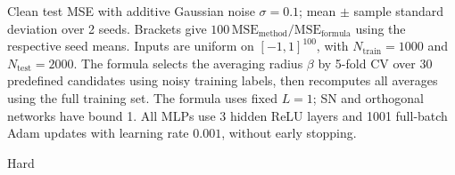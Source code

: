 \documentclass[10pt]{article}
\begin{document}
\begin{table}[t]
\centering
\footnotesize
\setlength{\tabcolsep}{3pt}
\caption{Clean test MSE with additive Gaussian noise $\sigma=0.1$; mean $\pm$ sample standard deviation over 2 seeds. Brackets give $100\,\mathrm{MSE}_{\mathrm{method}}/\mathrm{MSE}_{\mathrm{formula}}$ using the respective seed means. Inputs are uniform on $[-1,1]^{100}$, with $N_{\mathrm{train}}=1000$ and $N_{\mathrm{test}}=2000$. The formula selects the averaging radius $\beta$ by 5-fold CV over 30 predefined candidates using noisy training labels, then recomputes all averages using the full training set. The formula uses fixed $L=1$; SN and orthogonal networks have bound 1. All MLPs use 3 hidden ReLU layers and 1001 full-batch Adam updates with learning rate $0.001$, without early stopping.}
\label{tab:noisy-0p1-ratio1}
\begin{subtable}{\textwidth}
\centering
\caption{Hard}
\label{tab:noisy-0p1-ratio1-1}
\end{subtable}
\par\medskip
\begin{subtable}{\textwidth}
\centering
\caption{Tied}
\label{tab:noisy-0p1-ratio1-2}
\end{subtable}
\end{table}
\end{document}

